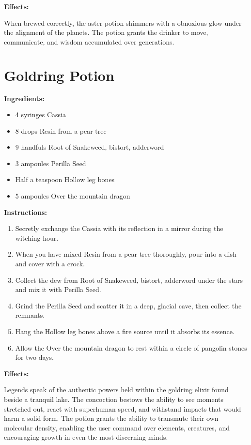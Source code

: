 \documentclass{article}
\begin{document}
\textbf{Effects:}

When brewed correctly, the aster potion shimmers with a obnoxious glow under the alignment of the planets. The potion grants the drinker to move, communicate, and wisdom accumulated over generations.

\newpage
\section*{Goldring Potion}

\textbf{Ingredients:}

\begin{itemize}
  \item 4 syringes Cassia
  \item 8 drops Resin from a pear tree
  \item 9 handfuls Root of Snakeweed, bistort, adderword
  \item 3 ampoules Perilla Seed
  \item Half a teaspoon Hollow leg bones
  \item 5 ampoules Over the mountain dragon
\end{itemize}

\textbf{Instructions:}

\begin{enumerate}
  \item Secretly exchange the Cassia with its reflection in a mirror during the witching hour.
  \item When you have mixed Resin from a pear tree thoroughly, pour into a dish and cover with a crock.
  \item Collect the dew from Root of Snakeweed, bistort, adderword under the stars and mix it with Perilla Seed.
  \item Grind the Perilla Seed and scatter it in a deep, glacial cave, then collect the remnants.
  \item Hang the Hollow leg bones above a fire source until it absorbs its essence.
  \item Allow the Over the mountain dragon to rest within a circle of pangolin stones for two days.
\end{enumerate}

\textbf{Effects:}

Legends speak of the authentic powers held within the goldring elixir found beside a tranquil lake. The concoction bestows the ability to see moments stretched out, react with superhuman speed, and withstand impacts that would harm a solid form. The potion grants the ability to transmute their own molecular density, enabling the user command over elements, creatures, and encouraging growth in even the most discerning minds.
\end{document}
